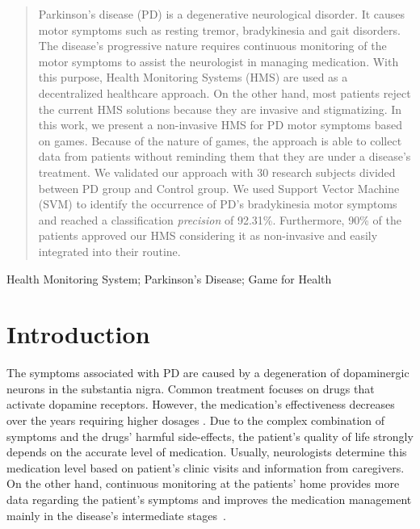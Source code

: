 \documentclass[10pt, conference, compsocconf]{IEEEtran}
\begin{document}




\maketitle


\begin{abstract}
Parkinson's disease (PD) is a degenerative neurological disorder. It causes motor symptoms such as resting tremor, bradykinesia and gait disorders. The disease's progressive nature requires continuous monitoring of the motor symptoms to assist the neurologist in managing medication. With this purpose, Health Monitoring Systems (HMS) are used as a decentralized healthcare approach. On the other hand, most patients reject the current HMS solutions because they are invasive and stigmatizing. In this work, we present a non-invasive HMS for PD motor symptoms based on games. Because of the nature of games, the approach is able to collect data from patients without reminding them that they are under a disease's treatment. We validated our approach with 30 research subjects divided between PD group and Control group. We used Support Vector Machine (SVM) to identify the occurrence of PD's bradykinesia motor symptoms and reached a classification \textit{precision} of 92.31\%. Furthermore, 90\% of the patients approved our HMS considering it as non-invasive and easily integrated into their routine.
\end{abstract}

\begin{IEEEkeywords}
Health Monitoring System; Parkinson's Disease; Game for Health
\end{IEEEkeywords}


\IEEEpeerreviewmaketitle



\section{Introduction}

The symptoms associated with PD are caused by a degeneration of dopaminergic neurons in the substantia nigra. Common treatment focuses on drugs that activate dopamine receptors. However, the medication's effectiveness decreases over the years requiring higher dosages \cite{national2006parkinson}. Due to the complex combination of symptoms and the drugs' harmful side-effects, the patient's quality of life strongly depends on the accurate level of medication. Usually, neurologists determine this medication level based on patient's clinic visits and information from caregivers. On the other hand, continuous monitoring at the patients' home provides more data regarding the patient's symptoms and improves the medication management mainly in the disease's intermediate stages~\cite{national2006parkinson}.
\end{document}
